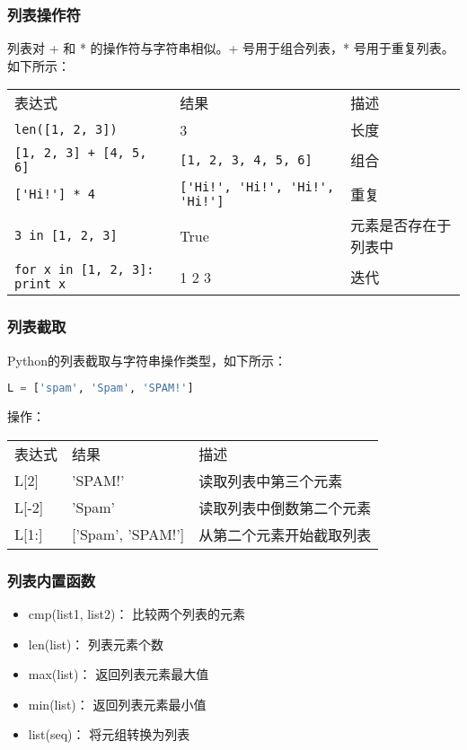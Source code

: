 \subsubsection{列表操作符}
列表对 + 和 * 的操作符与字符串相似。+ 号用于组合列表，* 号用于重复列表。
如下所示：

\begin{tabular}{l|l|l}
表达式&	结果&	描述\\
\verb|len([1, 2, 3])|&	3&	长度\\
\verb|[1, 2, 3] + [4, 5, 6]|&	\verb|[1, 2, 3, 4, 5, 6]|&	组合\\
\verb|['Hi!'] * 4| &	\verb|['Hi!', 'Hi!', 'Hi!', 'Hi!']| &	重复\\
\verb|3 in [1, 2, 3]| &	True&	元素是否存在于列表中\\
\verb|for x in [1, 2, 3]: print x| &	1 2 3&	迭代
\end{tabular}


\subsubsection{列表截取}
Python的列表截取与字符串操作类型，如下所示：
\begin{lstlisting}[language=Python]
L = ['spam', 'Spam', 'SPAM!']
\end{lstlisting}
操作：

\begin{tabular}{l|l|l}
表达式&	结果&	描述\\
L[2]&	'SPAM!'	&读取列表中第三个元素\\
L[-2]&	'Spam'	&读取列表中倒数第二个元素\\
L[1:]&	['Spam', 'SPAM!']&	从第二个元素开始截取列表
\end{tabular}


\subsubsection{列表内置函数}
\begin{itemize}
\item cmp(list1, list2)：
比较两个列表的元素
\item	len(list)：
列表元素个数
\item	max(list)：
返回列表元素最大值
\item	min(list)：
返回列表元素最小值
\item	list(seq)：
将元组转换为列表
\end{itemize}


